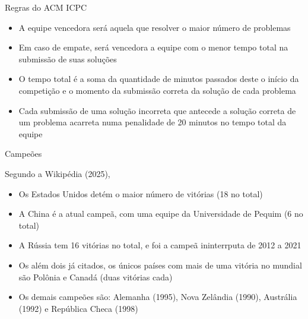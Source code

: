 \begin{frame}[fragile]{Regras do ACM ICPC}

    \begin{itemize}
        \item A equipe vencedora será aquela que resolver o maior número de problemas
        \item Em caso de empate, será vencedora a equipe com o menor tempo total na
        submissão de suas soluções
        \item O tempo total é a soma da quantidade de minutos passados deste o início da
        competição e o momento da submissão correta da solução de cada problema
        \item Cada submissão de uma solução incorreta que antecede a
        solução correta de um problema acarreta numa penalidade de 20 minutos no tempo total da
        equipe
    \end{itemize}

\end{frame}

\begin{frame}[fragile]{Campeões}

    Segundo a Wikipédia (2025),

    \begin{itemize}
        \item Os Estados Unidos detém o maior número de vitórias (18 no total)
        \item A China é a atual campeã, com uma equipe da Universidade de Pequim (6 no total)
        \item A Rússia tem 16 vitórias no total, e foi a campeã ininterrputa de 2012 a 2021 
        \item Os além dois já citados, os únicos países com mais de uma vitória no mundial são
             Polônia e Canadá (duas vitórias cada)
        \item Os demais campeões são: Alemanha (1995), Nova Zelândia (1990), Austrália (1992)  e
            República Checa (1998)
    \end{itemize}

\end{frame}
